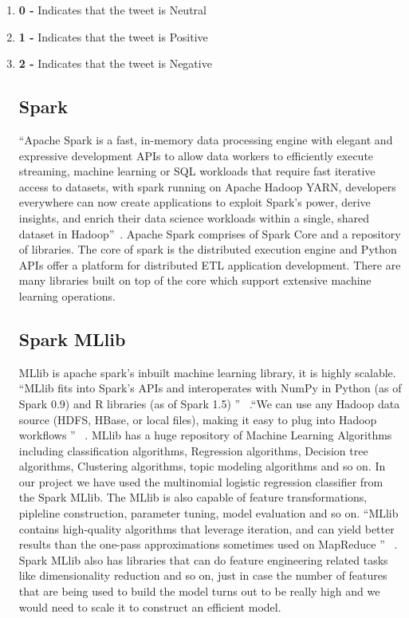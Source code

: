 \begin{enumerate}
\item \textbf{0 - } 
Indicates that the tweet is Neutral
\item \textbf{1 - } 
Indicates that the tweet is Positive
\item \textbf{2 - } 
Indicates that the tweet is Negative

\subsection{Spark}
``Apache Spark is a fast, in-memory data processing engine with elegant and expressive 
development APIs to allow data workers to efficiently execute streaming, machine 
learning or SQL workloads that require fast iterative access to datasets, with spark running 
on Apache Hadoop YARN, developers everywhere can now create applications 
to exploit Spark’s power, derive insights, and enrich their data science workloads 
within a single, shared dataset in Hadoop''~\cite{hid-sp18-418-spark}. Apache Spark comprises 
of Spark Core and a repository of libraries. The core of spark is the distributed execution 
engine and Python APIs offer a platform for distributed ETL application development. There are many 
libraries built on top of the core which support extensive machine learning operations.

\subsection{Spark MLlib}
MLlib is apache spark's inbuilt machine learning library, it is highly scalable. 
``MLlib fits into Spark's APIs and interoperates with NumPy in Python (as of Spark 0.9) 
and R libraries (as of Spark 1.5) '' ~\cite{hid-sp18-418-sparkml}.``We can use any Hadoop data source 
(HDFS, HBase, or local files), making it easy to plug into Hadoop workflows '' ~\cite{hid-sp18-418-sparkml}. 
MLlib has a huge repository of Machine Learning Algorithms including classification algorithms, 
Regression algorithms, Decision tree algorithms, Clustering algorithms, topic modeling algorithms and 
so on. In our project we have used the multinomial logistic regression classifier from the Spark MLlib. The MLlib 
is also capable of feature transformations, pipleline construction, parameter tuning, model evaluation and 
so on. ``MLlib contains high-quality algorithms that leverage iteration, 
and can yield better results than the one-pass approximations sometimes used 
on MapReduce '' ~\cite{hid-sp18-418-sparkml}. Spark MLlib also has libraries that can 
do feature engineering related tasks like dimensionality reduction and so on, just in case 
the number of features that are being used to build the model turns out to be really high and 
we would need to scale it to construct an efficient model.


\end{enumerate}
